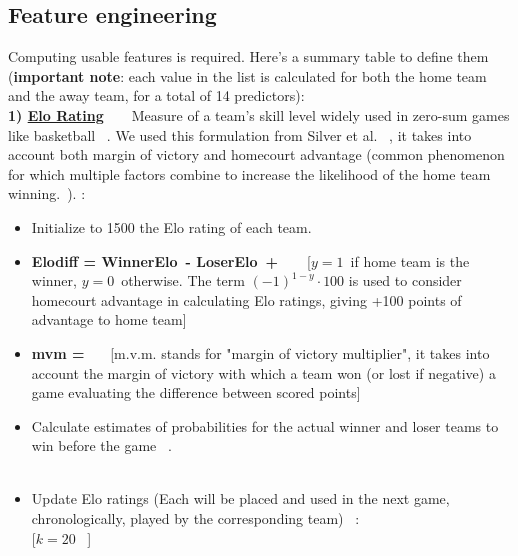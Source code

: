 \documentclass{article}
\begin{document}
\subsection{Feature engineering}
Computing usable features is required. Here's a summary table to define them (\textbf{important note}: each value in the list is calculated for both the home team and the away team, for a total of 14 predictors): \\
\textbf{1) \underline{Elo Rating}}\ \ \ \  Measure of a team's skill level widely used in zero-sum games like basketball ~\cite{Elo1978TheRO}. We used this formulation from Silver et al. ~\cite{bworld}, it takes into account both margin of victory and homecourt advantage (common phenomenon for which multiple factors combine to increase the likelihood of the home team winning.~\cite{doi:10.1260/1747-9541.9.4.681}). 
:
\begin{itemize}
    \item Initialize to 1500 the Elo rating of each team.
    \item \textbf{Elo\textunderscore diff = Winner\textunderscore Elo\  - Loser\textunderscore Elo\  +\  }\ \ \  [$y=1$\ if home team is  the winner, $y=0$\ otherwise. The term $(-1)^{1-y}  \cdot100$ is  used to consider homecourt advantage in calculating 
    Elo ratings, giving +100 points of advantage to home team]
    \item \textbf{mvm = }\ \ \ [m.v.m. stands for "margin of victory multiplier", it takes into account the margin of victory with which a team won (or lost if negative) a game evaluating the difference between scored points]~\cite{bworld}
    \item  Calculate estimates of probabilities for the actual winner and loser teams to win before the game ~\cite{Best2023}.\\
    \\
    \item Update Elo ratings (Each will be placed and used in the next game, chronologically, played by the corresponding team) ~\cite{Best2023}:\\
     [$k=20$ ~\cite{bworld}]
\end{itemize} 
\end{document}
